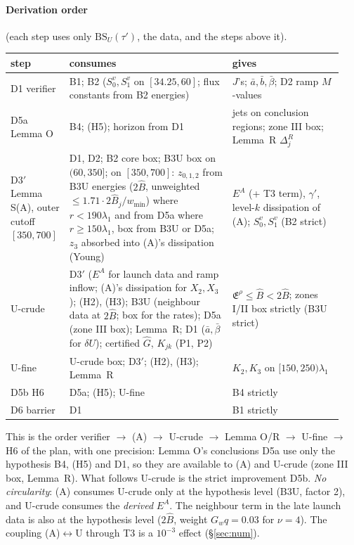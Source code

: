\documentclass[11pt]{article}
\theoremstyle{remark}\newtheorem{remark}[theorem]{Remark}
\newcommand{\E}{\mathfrak E}
\begin{document}
\paragraph{Derivation order} (each step uses only $\mathrm{BS}_U(\tau')$, the data, and the steps above it).
\begin{center}\small\begin{tabular}{@{}p{0.15\linewidth}p{0.47\linewidth}p{0.32\linewidth}@{}}\toprule
step & consumes & gives\\\midrule
D1 verifier & B1; B2 ($S_0^v,S_1^v$ on $[34.25,60]$; flux constants from B2 energies) & $J$'s; $\bar a,\bar b,\bar\beta$; D2 ramp $M$-values\\
D5a Lemma O & B4; (H5); horizon from D1 & jets on conclusion regions; zone III box; Lemma~R $\Delta^R_j$\\
D3$'$ Lemma S(A), outer cutoff $[350,700]$ & D1, D2; B2 core box; B3U box on $(60,350]$; on $[350,700]$: $z_{0,1,2}$ from B3U energies ($2\hat B$, unweighted $\le1.71\cdot2\hat B_j/w_{\min}$) where $r<190\lambda_1$ and from D5a where $r\ge150\lambda_1$, box from B3U or D5a; $z_3$ absorbed into (A)'s dissipation (Young) & $E^A$ (+ T3 term), $\gamma'$, level-$k$ dissipation of (A); $S_0^v,S_1^v$ (B2 strict)\\
U-crude & D3$'$ ($E^A$ for launch data and ramp inflow; (A)'s dissipation for $X_2,X_3$); (H2), (H3); B3U (neighbour data at $2\hat B$; box for the rates); D5a (zone III box); Lemma~R; D1 ($\bar a,\bar\beta$ for $\delta U$); certified $\hat G$, $K_{jk}$ (P1, P2) & $\E^\rho\le\hat B<2\hat B$; zones I/II box strictly (B3U strict)\\
U-fine & U-crude box; D3$'$; (H2), (H3); Lemma~R & $K_2,K_3$ on $[150,250)\lambda_1$\\
D5b H6 & D5a; (H5); U-fine & B4 strictly\\
D6 barrier & D1 & B1 strictly\\\bottomrule
\end{tabular}\end{center}
This is the order verifier $\to$ (A) $\to$ U-crude $\to$ Lemma O/R $\to$ U-fine $\to$ H6 of the plan, with one precision: Lemma O's conclusions D5a use only the hypothesis B4, (H5) and D1, so they are available to (A) and U-crude (zone III box, Lemma~R). What follows U-crude is the strict improvement D5b. \emph{No circularity}: (A) consumes U-crude only at the hypothesis level (B3U, factor 2), and U-crude consumes the \emph{derived} $E^A$. The neighbour term in the late launch data is also at the hypothesis level ($2\hat B$, weight $G_wq=0.03$ for $\nu=4$). The coupling (A)$\leftrightarrow$U through T3 is a $10^{-3}$ effect (\S\ref{sec:num}).
\end{document}
